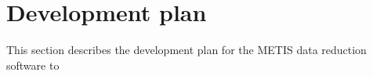 \clearpage
\section{Development plan}\label{sec:development_plan}

This section describes the development plan for the METIS data reduction software to 